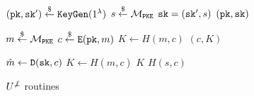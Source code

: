 \documentclass{article}
\begin{document}
\begin{figure}[H]
    \center
    \begin{minipage}{0.33\textwidth}
        \begin{algorithm}[H]
            \caption{$\keygen^{\not\bot}$}\label{alg:u-notbot-keygen}
            \begin{algorithmic}[1]
                \State $(\texttt{pk}, \texttt{sk}^\prime) \stackrel{\$}{\leftarrow} \texttt{KeyGen}(1^\lambda)$
                \State $s \stackrel{\$}{\leftarrow} \mathcal{M}_\texttt{PKE}$
                \State $\texttt{sk} = (\texttt{sk}^\prime, s)$
                \State \Return $(\texttt{pk}, \texttt{sk})$
            \end{algorithmic}
        \end{algorithm}
    \end{minipage}
    \hfill
    \begin{minipage}{0.33\textwidth}
        \begin{algorithm}[H]
            \caption{$\encap^{\not\bot}(\pk)$}\label{alg:u-notbot-encap}
            \begin{algorithmic}[1]
                \State $m \stackrel{\$}{\leftarrow} \mathcal{M}_\texttt{PKE}$
                \State $c \stackrel{\$}{\leftarrow} \texttt{E}(\texttt{pk}, m)$
                \State $K \leftarrow H(m, c)$
                \State \Return $(c, K)$
            \end{algorithmic}
        \end{algorithm}
    \end{minipage}
    \hfill
    \begin{minipage}{0.32\textwidth}
        \begin{algorithm}[H]
            \caption{$\decap^{\not\bot}(\sk, c)$}\label{alg:u-notbot-decap}
            \begin{algorithmic}[1]
                \State $\hat{m} \leftarrow \texttt{D}(\texttt{sk}, c)$
                    \State $K \leftarrow H(\hat{m}, c)$
                    \State \Return $K$
                \EndIf
                \State \Return $H(s, c)$
            \end{algorithmic}
        \end{algorithm}
    \end{minipage}
    \caption{$U^{\not\bot}$ routines}\label{fig:u-notbot-routines}
\end{figure}
\end{document}
